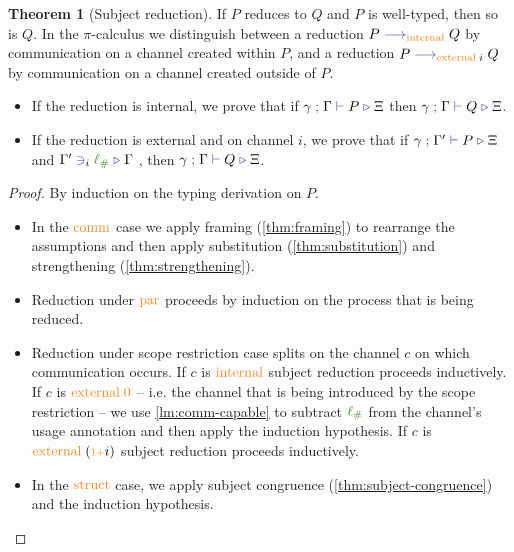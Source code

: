 \documentclass[a4paper,UKenglish,cleveref,autoref,thm-restate,authorcolumns]{lipics-v2019}
\theoremstyle{definition}
\newtheorem{nitheorem}{Theorem}
\newcommand{\picalc}{$\pi$-calculus}
\newcommand{\type}[1]{\textcolor{BlueViolet}{\operatorname{#1}}}
\newcommand{\constr}[1]{\textcolor{BurntOrange}{\operatorname{#1}}}
\newcommand{\func}[1]{\textcolor{OliveGreen}{\operatorname{#1}}}
\newcommand{\suc}{\constr{\scriptstyle 1+}}
\newcommand{\lio}{\func{\ell_{\#}}}
\newcommand{\reduce}[1]{\; \type{\longrightarrow}_{#1} \;}
\newcommand{\types}[4]{#1 \; \type{;} \; #2 \; \type{\vdash} \; #3 \; \type{\triangleright} \; #4}
\newcommand{\containsusage}[4]{#1 \; \type{\ni}_{#2} \; #3 \; \type{\triangleright} \; #4}
\begin{document}
\begin{nitheorem}[Subject reduction]
  If $P$ reduces to $Q$ and $P$ is well-typed, then so is $Q$.
  In the \picalc{} we distinguish between a reduction $P \reduce{\constr{internal}} Q$ by communication on a channel created within $P$, and a reduction $P \reduce{\constr{external} \; i} Q$ by communication on a channel created outside of $P$.
  \begin{itemize}
    \item If the reduction is internal, we prove that if $\types{\gamma}{\Gamma}{P}{\Xi}$ then $\types{\gamma}{\Gamma}{Q}{\Xi}$.
    \item If the reduction is external and on channel $i$, we prove that if $\types{\gamma}{\Gamma'}{P}{\Xi}$ and $\containsusage{\Gamma'}{i}{\lio}{\Gamma}$ , then $\types{\gamma}{\Gamma}{Q}{\Xi}$.
  \end{itemize}
\end{nitheorem}

\begin{proof}
  By induction on the typing derivation on $P$.
  \hfill{}\\
  \begin{itemize}
    \item
    In the $\constr{comm}$ case we apply framing (\autoref{thm:framing}) to rearrange the assumptions and then apply substitution (\autoref{thm:substitution}) and strengthening (\autoref{thm:strengthening}).
  
    \item
    Reduction under $\constr{par}$ proceeds by induction on the process that is being reduced.

    \item
    Reduction under scope restriction case splits on the channel $c$ on which communication occurs.
    If $c$ is $\constr{internal}$ subject reduction proceeds inductively.
    If $c$ is $\constr{external}\; \constr{0}$ -- i.e. the channel that is being introduced by the scope restriction -- we use \autoref{lm:comm-capable} to subtract $\lio$ from the channel's usage annotation and then apply the induction hypothesis.
    If $c$ is $\constr{external}\; (\suc i)$ subject reduction proceeds inductively.

    \item
    In the $\constr{struct}$ case, we apply subject congruence (\autoref{thm:subject-congruence}) and the induction hypothesis.
  \end{itemize}
\end{proof}
\end{document}
